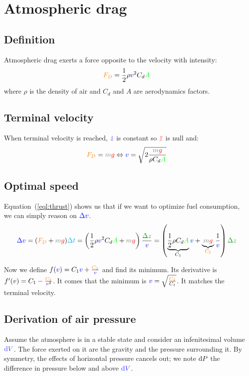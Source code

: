 \section{Atmospheric drag}


\subsection{Definition}

Atmospheric drag exerts a force opposite to the velocity with intensity:
\[
\textcolor{orange}{F_D}
= \frac 1 2 \rho \textcolor{blue}{v}^2 C_d \textcolor{green}{A}
\]
where $\rho$ is the density of air and $C_d$ and $A$ are aerodynamics
factors.


\subsection{Terminal velocity}

When terminal velocity is reached, $\textcolor{blue}{\dot z}$ is constant so
$\textcolor{red}{\ddot z}$ is null and:
\[
\force{F_D} = \mass{m} \accel{g}
\Leftrightarrow
\speed{v} = \sqrt{2\frac {\mass{m} \accel{g}} {\rho C_d \area{A}}}
\]


\subsection{Optimal speed}

Equation~(\ref{eql:thrust}) shows us that if we want to optimize fuel consumption, we can simply reason on $\textcolor{blue}{\Delta v}$.
\[
\speed{\Delta v}
= (\force{F_D} + \mass{m} \accel{g}) \delay{\Delta t}
= \left(\frac 1 2 \rho \speed{v}^2 C_d \area{A} + \mass{m} \accel{g}\right) \frac {\dist{\Delta z}} {\speed{v}}
= \left(
	\underbrace{\frac 1 2 \rho C_d \area{A}}_{C_1} \speed{v} +
	\underbrace{\mass{m} \accel{g}}_{\force{C_2}} \frac 1 {\speed{v}}
\right) \dist{\Delta z}
\]

Now we define $f(\textcolor{blue}{v}) = C_1 \textcolor{blue}{v} + \frac {\textcolor{orange}{C_2}}
{\textcolor{blue}{v}}$ and find its minimum. Its derivative is $f'(v) = C_1 - \frac
{\textcolor{orange}{C_2}} {\textcolor{blue}{v}^2}$. It comes that the minimum is $\textcolor{blue}{v}
= \sqrt{\frac {\textcolor{orange}{C_2}} {C_1}}$.  It matches the terminal velocity.


\subsection{Derivation of air pressure}

Assume the atmosphere is in a stable state and consider an infenitesimal
volume $\vol{\d V}$. The force exerted on it are the gravity and the
pressure surrounding it. By symmetry, the effects of horizontal pressure
cancels out; we note $\mathrm{d} P$ the difference in pressure below and above
$\vol{\d V}$.

